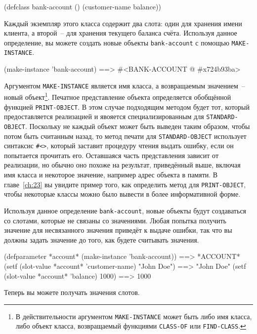 \begin{myverb}
(defclass bank-account ()
  (customer-name
   balance))
\end{myverb}

Каждый экземпляр этого класса содержит два слота: один для хранения имени клиента, а
второй~-- для хранения текущего баланса счёта.  Используя данное определение, вы можете
создать новые объекты \lstinline{bank-account} с помощью \lstinline{MAKE-INSTANCE}.

\begin{myverb}
  (make-instance 'bank-account) ==> #<BANK-ACCOUNT @ #x724b93ba>
\end{myverb}

Аргументом \lstinline{MAKE-INSTANCE} является имя класса, а возвращаемым значением~-- новый
объект\footnote{В действительности аргументом \lstinline{MAKE-INSTANCE} может быть либо имя
  класса, либо объект класса, возвращаемый функциями \lstinline{CLASS-OF} или
  \lstinline{FIND-CLASS}.}.  Печатное представление объекта определяется обобщённой функцией
\lstinline{PRINT-OBJECT}.  В этом случае подходящим методом будет тот, который предоставляется
реализацией и явояется специализированным для \lstinline{STANDARD-OBJECT}.  Поскольку не каждый объект
может быть выведен таким образом, чтобы потом быть считанным назад, то метод печати для
\lstinline{STANDARD-OBJECT} использует синтаксис \lstinline!#<>!, который заставит процедуру
чтения выдать ошибку, если он попытается прочитать его.  Оставшаяся часть представления
зависит от реализации, но обычно оно похоже на результат, приведённый выше, включая имя
класса и некоторое значение, например адрес объекта в памяти.  В главе~\ref{ch:23} вы
увидите пример того, как определить метод для \lstinline{PRINT-OBJECT}, чтобы некоторые классы
можно было вывести в более информативной форме.

Используя данное определение \lstinline{bank-account}, новые объекты будут создаваться со
слотами, которые не связаны со значениями.  Любая попытка получить значение для
несвязанного значения приведёт к выдаче ошибки, так что вы должны задать значение до того,
как будете считывать значения.

\begin{myverb}
  (defparameter *account* (make-instance 'bank-account))  ==> *ACCOUNT*
  (setf (slot-value *account* 'customer-name) "John Doe") ==> "John Doe"
  (setf (slot-value *account* 'balance) 1000)             ==> 1000
\end{myverb}

Теперь вы можете получать значения слотов.

